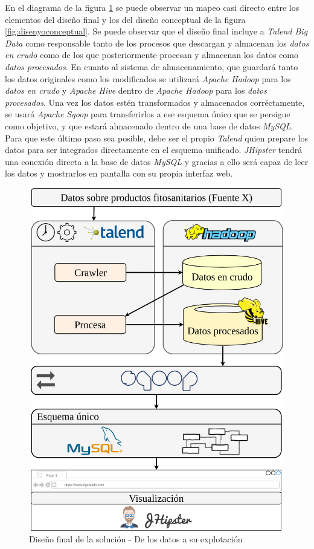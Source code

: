 En el diagrama de la figura \ref{fig:disenyofinal} se puede observar un mapeo casi directo entre los elementos del diseño final y los del diseño conceptual de la figura \ref{fig:disenyoconceptual}. Se puede observar que el diseño final incluye a \textit{Talend Big Data} como responsable tanto de los procesos que descargan y almacenan los \textit{datos en crudo} como de los que posteriormente procesan y almacenan los datos como \textit{datos procesados}. En cuanto al sistema de almacenamiento, que guardará tanto los datos originales como los modificados se utilizará \textit{Apache Hadoop} para los \textit{datos en crudo} y \textit{Apache Hive} dentro de \textit{Apache Hadoop} para los \textit{datos procesados}. Una vez los datos estén transformados y almacenados corréctamente, se usará \textit{Apache Sqoop} para transferirlos a ese esquema único que se persigue como objetivo, y que estará almacenado dentro de una base de datos \textit{MySQL}. Para que este último paso sea posible, debe ser el propio \textit{Talend} quien prepare los datos para ser integrados directamente en el esquema unificado. \textit{JHipster} tendrá una conexión directa a la base de datos \textit{MySQL} y gracias a ello será capaz de leer los datos y mostrarlos en pantalla con su propia interfaz web. 
\begin{figure}[H]
    \centering
    \includegraphics[width=1\textwidth,height=15cm,keepaspectratio]{Imagenes/disenyofinal}
    \caption{Diseño final de la solución - De los datos a su explotación}
    \label{fig:disenyofinal}
\end{figure}

